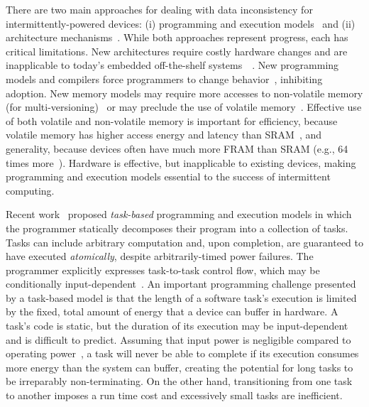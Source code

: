 There are two main approaches for dealing with data inconsistency for
intermittently-powered devices: (i) programming and execution
models~\cite{dino,ratchet,chain,alpaca} and (ii) architecture
mechanisms~\cite{hicks_isca_2017,idetic,nvp,tictpl}. While both approaches represent
progress, each has critical limitations. New architectures require costly
hardware changes and are inapplicable to today's embedded off-the-shelf
systems~\cite[Fig.  3]{hicks_isca_2017}~\cite[Fig. 9]{nvp}. New programming
models and compilers force programmers to change behavior~\cite{chain,ratchet},
inhibiting adoption.  New memory models may require more accesses to
non-volatile memory (for multi-versioning)~\cite{dino,chain} or may preclude
the use of volatile memory~\cite{ratchet}.  Effective use of both volatile and
non-volatile memory is important for efficiency, because volatile memory has
higher access energy and latency than SRAM~\cite[Fig. 4]{nvp}, and generality,
because devices often have much more FRAM than SRAM (e.g., 64 times
more~\cite{wolverine}). Hardware is effective, but inapplicable to existing
devices, making programming and execution models essential to the success of
intermittent computing. 

Recent work~\cite{alpaca,chain} proposed {\em task-based} programming and
execution models in which the programmer statically decomposes their program
into a collection of tasks.  Tasks can include arbitrary computation and, upon
completion, are guaranteed to have executed {\em atomically}, despite
arbitrarily-timed power failures. 
%
The programmer explicitly expresses task-to-task control flow, which may be
conditionally input-dependent~\cite[Fig. 4]{chain}. An important programming
challenge presented by a task-based model is that the length of a software task's execution
is limited by the fixed, total amount of energy that a device can buffer in
hardware.  A task's code is static, but the duration of its execution
may be input-dependent and is difficult to predict.
%
Assuming that input power is negligible compared to operating
power~\cite{wisp}, a task will never be able to complete if its execution
consumes more energy than the system can buffer, creating the potential for
long tasks to be irreparably non-terminating.  On the other hand, transitioning
from one task to another imposes a run time cost and excessively small tasks
are inefficient. 

